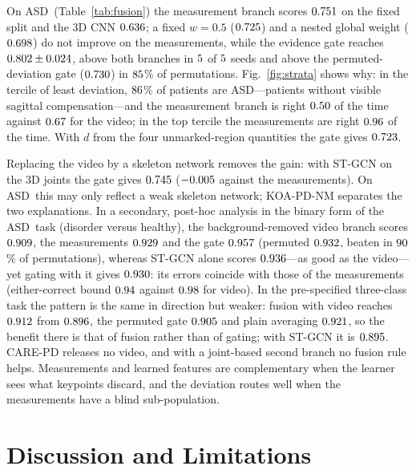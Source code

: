 \documentclass[runningheads]{llncs}
\newcommand{\asd}{ASD}
\begin{document}
On \asd\ (Table~\ref{tab:fusion}) the measurement branch scores $0.751$ on the fixed
split and the 3D CNN $0.636$; a fixed $w{=}0.5$ ($0.725$) and a nested global
weight ($0.698$) do not improve on the measurements, while the evidence gate reaches
$0.802\pm0.024$, above both branches in $5$ of $5$ seeds and
above the permuted-deviation gate ($0.730$) in $85$\% of permutations.
Fig.~\ref{fig:strata} shows why: in the tercile of least deviation, $86$\% of
patients are \asd---patients without visible sagittal compensation---and the measurement
branch is right $0.50$ of the time against $0.67$ for the video; in the
top tercile the measurements are right $0.96$ of the time. With $d$ from the four
unmarked-region quantities the gate gives $0.723$.

Replacing the video by a skeleton network removes the gain: with ST-GCN on the 3D joints
the gate gives $0.745$ ($-0.005$ against the measurements). On
\asd\ this may only reflect a weak skeleton network; KOA-PD-NM separates the two
explanations. In a secondary, post-hoc analysis in the binary form of the \asd\ task
(disorder versus healthy), the background-removed video branch scores $0.909$,
the measurements $0.929$ and the gate $0.957$ (permuted $0.932$, beaten in
$90$\% of permutations), whereas ST-GCN alone scores
$0.936$---as good as the video---yet gating with it gives $0.930$: its
errors coincide with those of the measurements (either-correct bound $0.94$
against $0.98$ for video). In the pre-specified three-class task the pattern
is the same in direction but weaker: fusion with video reaches $0.912$ from
$0.896$, the permuted gate $0.905$ and plain averaging $0.921$, so
the benefit there is that of fusion rather than of gating; with ST-GCN it is
$0.895$. CARE-PD releases no video, and with a joint-based second branch no
fusion rule helps. Measurements and learned features are complementary when the learner sees what keypoints
discard, and the deviation routes well when the measurements have a blind sub-population.

\section{Discussion and Limitations}
\end{document}
